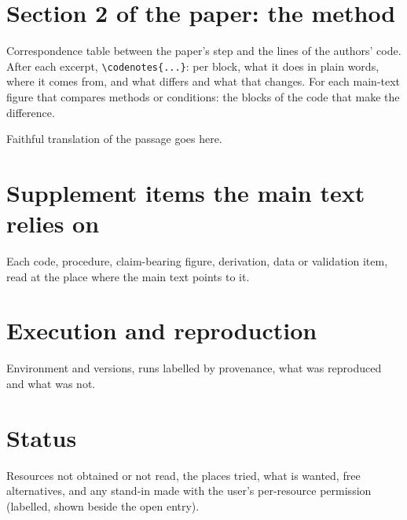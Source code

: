 \documentclass[a4paper,11pt]{article}
\begin{document}
\section{Section 2 of the paper: the method}
\begin{bgcard}
\end{bgcard}
Correspondence table between the paper's step and the lines of the authors' code. After each
excerpt, \verb|\codenotes{...}|: per block, what it does in plain words, where it comes from,
and what differs and what that changes.
For each main-text figure that compares methods or conditions: the blocks of the code that make
the difference.
\begin{trans}Faithful translation of the passage goes here.\end{trans}

\section{Supplement items the main text relies on}
Each code, procedure, claim-bearing figure, derivation, data or validation item, read at the
place where the main text points to it.

\section{Execution and reproduction}
Environment and versions, runs labelled by provenance, what was reproduced and what was not.

\section{Status}
Resources not obtained or not read, the places tried, what is wanted, free alternatives, and any
stand-in made with the user's per-resource permission (labelled, shown beside the open entry).
\end{document}
